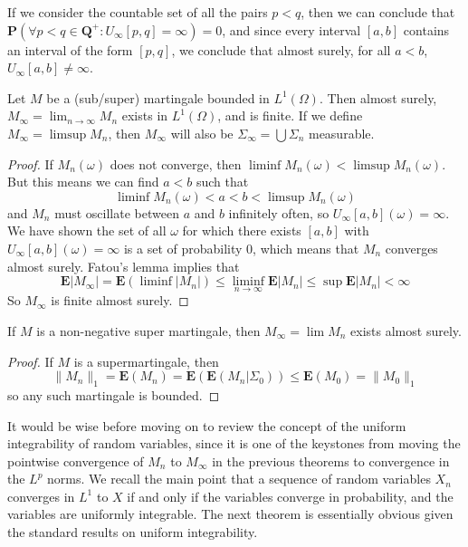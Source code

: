 If we consider the countable set of all the pairs $p < q$, then we can conclude that $\mathbf{P}(\forall p < q \in \mathbf{Q}^+: U_\infty[p,q] = \infty) = 0$, and since every interval $[a,b]$ contains an interval of the form $[p,q]$, we conclude that almost surely, for all $a < b$, $U_\infty[a,b] \neq \infty$.

\begin{theorem}
    Let $M$ be a (sub/super) martingale bounded in $L^1(\Omega)$. Then almost surely, $M_\infty = \lim_{n \to \infty} M_n$ exists in $L^1(\Omega)$, and is finite. If we define $M_\infty = \limsup M_n$, then $M_\infty$ will also be $\Sigma_\infty = \bigcup \Sigma_n$ measurable.
\end{theorem}
\begin{proof}
    If $M_n(\omega)$ does not converge, then $\liminf M_n(\omega) < \limsup M_n(\omega)$. But this means we can find $a < b$ such that
    \[ \liminf M_n(\omega) < a < b < \limsup M_n(\omega) \]
    and $M_n$ must oscillate between $a$ and $b$ infinitely often, so $U_\infty[a,b](\omega) = \infty$. We have shown the set of all $\omega$ for which there exists $[a,b]$ with $U_\infty[a,b](\omega) = \infty$ is a set of probability 0, which means that $M_n$ converges almost surely. Fatou's lemma implies that
    \[ \mathbf{E}|M_\infty| = \mathbf{E}(\liminf |M_n|) \leq \liminf_{n \to \infty} \mathbf{E} |M_n| \leq \sup \mathbf{E}|M_n| < \infty \]
    So $M_\infty$ is finite almost surely.
\end{proof}

\begin{corollary}
    If $M$ is a non-negative super martingale, then $M_\infty = \lim M_n$ exists almost surely.
\end{corollary}
\begin{proof}
    If $M$ is a supermartingale, then
    \[ \|M_n\|_1 = \mathbf{E}(M_n) = \mathbf{E}(\mathbf{E}(M_n|\Sigma_0)) \leq \mathbf{E}(M_0) = \|M_0\|_1 \]
    so any such martingale is bounded.
\end{proof}

It would be wise before moving on to review the concept of the uniform integrability of random variables, since it is one of the keystones from moving the pointwise convergence of $M_n$ to $M_\infty$ in the previous theorems to convergence in the $L^p$ norms. We recall the main point that a sequence of random variables $X_n$ converges in $L^1$ to $X$ if and only if the variables converge in probability, and the variables are uniformly integrable. The next theorem is essentially obvious given the standard results on uniform integrability.

